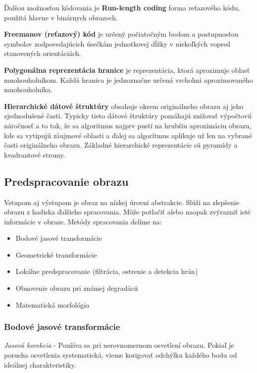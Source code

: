 \begin{itemize}
Ďalšou možnosťou kódovania je \textbf{Run-length coding} forma reťazového kódu, použitá hlavne v binárnych obrazoch. 

\textbf{Freemanov (reťazový) kód}  je určený počiatočným bodom a postupnosťou symbolov zodpovedajúcich úsečkám jednotkovej dĺžky v niekoľkých vopred stanovených orientáciách. 

\textbf{Polygonálna reprezentácia hranice} je reprezentácia, ktorá aproximuje oblasť mnohouholníkom. Každá hranica je jednoznačne určená vrcholmi aproximovaného mnohouholníka.

\textbf{Hierarchické dátové štruktúry} obsahuje okrem originálneho obrazu aj jeho zjednodušené časti. Typicky tieto dátové štruktúry pomáhajú znižovať výpočtovú náročnosť a to tak, že sa algoritmus najprv pustí na hrubšiu aproximáciu obrazu, kde sa vytipujú záujmové oblasti a ďalej sa algoritmus aplikuje už len na vybrané časti originálneho obrazu. Základné hierarchické reprezentácie sú pyramídy a kvadrantové stromy. 

\end{itemize}



\subsection{Predspracovanie obrazu}
Vstupom aj výstupom je obraz na nízkej úrovni abstrakcie. Slúži na zlepšenie obrazu z hadiska ďalšieho spracovania. Môže potlačiť alebo naopak zvýrazniť isté informácie v obraze. Metódy spracovania delíme na: 
\begin{itemize}
\item Bodové jasové transformácie
\item Geometrické transformácie
\item Lokálne predspracovanie (filtrácia, ostrenie a detekcia hrán)
\item Obnovenie obrazu pri známej degradácii 
\item Matematická morfológia 
\end{itemize}

\subsubsection{Bodové jasové transformácie}

\textit{Jasová korekcia} - Používa sa pri nerovnomernom osvetlení obrazu. Pokiaľ je porucha
osvetlenia systematická, vieme korigovať odchýlku každého bodu od ideálnej charakteristiky.

